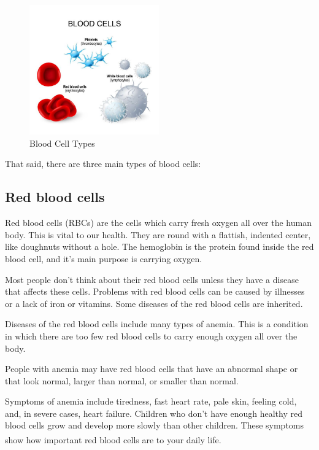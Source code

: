\begin{figure}[h]
\centering
  \vspace{-0.2in}
    \centerline{\includegraphics[width = 2.2in]{../images/BloodCells.jpg}}
    \caption{Blood Cell Types}
    \label{fig:bloodCellTypes}
\end{figure}

That said, there are three main types of blood cells:

\subsection{Red blood cells}
\hspace{\parindent}
Red blood cells (RBCs) are the cells which carry fresh oxygen all over the human body. This is vital to our health. They are round with a flattish, indented center, like doughnuts without a hole. 
The hemoglobin is the protein found inside the red blood cell, and it's main purpose is carrying oxygen.\

Most people don't think about their red blood cells unless they have a disease that affects these cells. Problems with red blood cells can be caused by illnesses or a lack of iron or vitamins. Some diseases of the red blood cells are inherited.

Diseases of the red blood cells include many types of anemia. This is a condition in which there are too few red blood cells to carry enough oxygen all over the body.

People with anemia may have red blood cells that have an abnormal shape or that look normal, larger than normal, or smaller than normal.

Symptoms of anemia include tiredness, fast heart rate, pale skin, feeling cold, and, in severe cases, heart failure. Children who don't have enough healthy red blood cells grow and develop more slowly than other children. These symptoms show how important red blood cells are to your daily life. \textsuperscript{\cite{RBC-urmcrochester}}

